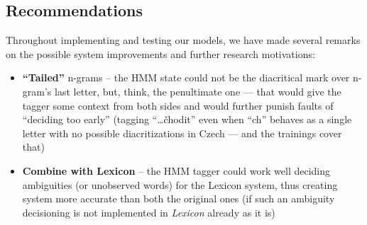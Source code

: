 \documentclass[12pt]{article}
\begin{document}
    \subsection{Recommendations}\label{subsec:recommendations}
    Throughout implementing and testing our models, we have made several remarks on the possible system improvements and further research motivations:
    \begin{itemize}
        \item \textbf{``Tailed''} n-grams -- the HMM state could not be the diacritical mark over n-gram's last letter, but, think, the penultimate one --- that would give the tagger some context from both sides and would further punish faults of ``deciding too early'' (tagging ``\ldots\v{c}hodit'' even when ``ch'' behaves as a single letter with no possible diacritizations in Czech --- and the trainings cover that)
        \item \textbf{Combine with Lexicon} -- the HMM tagger could work well deciding ambiguities (or unobserved words) for the Lexicon system, thus creating system more accurate than both the original ones (if such an ambiguity decisioning is not implemented in \textit{Lexicon} already as it is)
    \end{itemize}
    \newpage
    
    
\end{document}
